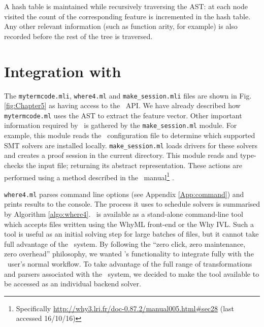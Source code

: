 A hash table is maintained while recursively traversing the AST: at each node visited the count of the corresponding feature is incremented in the hash table. 
Any other relevant information (such as function arity, for example) is also recorded before the rest of the tree is traversed. 

\section{Integration with \why}
\label{sec:why3-integration}

\sloppypar
The \texttt{mytermcode.mli}, \texttt{where4.ml} and \texttt{make\_session.mli} files are shown in Fig. \ref{fig:Chapter5} as having access to the \why~API. 
We have already described how \texttt{mytermcode.ml} uses the AST to extract the feature vector.
Other important information required by \why~is gathered by the \texttt{make\_session.ml} module.
For example, this module reads the \why~configuration file to determine which supported SMT solvers are installed locally.
\texttt{make\_session.ml} loads drivers for these solvers and creates a proof session in the current directory. This module reads and type-checks the input file; returning its abstract representation.
These actions are performed using a method described in the \why~manual\footnote{Specifically \url{http://why3.lri.fr/doc-0.87.2/manual005.html\#sec28} (last accessed 16/10/16)} \cite{why:manual}.

\texttt{where4.ml} parses command line options (see Appendix \ref{App:command}) and prints results to the console.
The process it uses to schedule solvers is summarised by Algorithm \ref{algo:where4}.
\where~is available as a stand-alone command-line tool which accepts files written using the WhyML front-end or the Why IVL.
Such a tool is useful as an initial solving step for large batches of files, but it cannot take full advantage of the \why~system.
By following the ``zero click, zero maintenance, zero overhead'' philosophy, we wanted \where's functionality to integrate fully with the \why~user's normal workflow.
To take advantage of the full range of transformations and parsers associated with the \why~system, we decided to make the tool available to be accessed as an individual backend solver.
   
